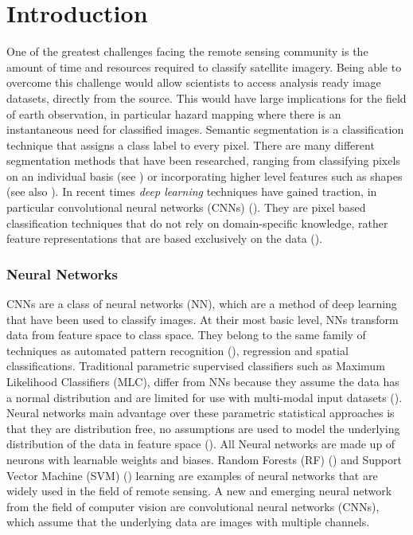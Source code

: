 \chapter{Introduction}
One of the greatest challenges facing the remote sensing community is the amount of time and resources required to classify satellite imagery. Being able to overcome this challenge would allow scientists to access analysis ready image datasets, directly from the source. This would have large implications for the field of earth observation, in particular hazard mapping where there is an instantaneous need for classified images. Semantic segmentation is a classification technique that assigns a class label to every pixel. There are many different segmentation methods that have been researched, ranging from classifying pixels on an individual basis (see \cite{de01,dwivedi04,enderle05,hussain13, weih10}) or incorporating higher level features such as shapes (see also \cite{akccay08,holt09,martha11}). In recent times \textit{deep learning} techniques have gained traction, in particular convolutional neural networks (CNNs) (\cite{maggiori17a, maggiori17b, mnih13, volpi17}). They are pixel based classification techniques that do not rely on domain-specific knowledge, rather feature representations that are based exclusively on the data (\cite{maggiori17a,xiao17}).
\subsection*{Neural Networks}
CNNs are a class of neural networks (NN), which are a method of deep learning that have been used to classify images. At their most basic level, NNs transform data from feature space to class space. They belong to the same family of techniques as automated pattern recognition (\cite{Ritter89}), regression and spatial classifications. Traditional parametric supervised classifiers such as Maximum Likelihood Classifiers (MLC), differ from NNs because they assume the data has a normal distribution and are limited for use with multi-modal input datasets (\cite{Liu11}). Neural networks main advantage over these parametric statistical approaches is that they are distribution free, no assumptions are used to model the underlying distribution of the data in feature space (\cite{Patricia97}). All Neural networks are made up of neurons with learnable weights and biases. Random Forests (RF) (\cite{belgiu16,Breiman01}) and Support Vector Machine (SVM) (\cite{cortes95,vapnik82}) learning are examples of neural networks that are widely used in the field of remote sensing. A new and emerging neural network from the field of computer vision are convolutional neural networks (CNNs), which assume that the underlying data are images with multiple channels. 
